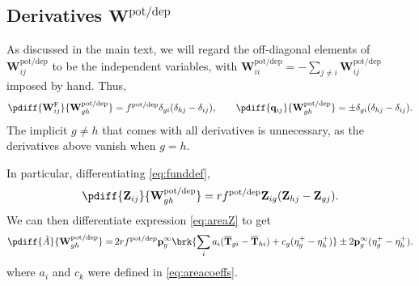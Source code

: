 \documentclass{article} %
\newcommand{\pr}{\mathbf{p}}
\newcommand{\eq}{\pr^\infty}
\newcommand{\fpt}{\mathbf{T}}
\newcommand{\fptb}{\overline{\fpt}}
\newcommand{\fund}{\mathbf{Z}}
\newcommand{\pib}{\boldsymbol{\pi}}
\newcommand{\w}{\mathbf{w}}
\newcommand{\W}{\mathbf{W}}
\newcommand{\enc}{\mathbf{q}}
\newcommand{\frg}{\W^{\mathrm{F}}}
\newcommand{\potdep}{^{\text{pot/dep}}}
\begin{document}
\subsection{Derivatives \wrt \texorpdfstring{$\W\potdep $}{W+/-}}\label{sec:deriv}

As discussed in the main text,
we will regard the off-diagonal elements of $\W\potdep _{ij}$ to be the independent variables,
with $\W\potdep _{ii}=-\sum_{j \neq i} \W\potdep _{ij}$ imposed by hand.
Thus,
%
\begin{equation}\label{eq:basicderivs}
  \pdiff{\frg_{ij}}{\W\potdep _{gh}} = f\potdep  \delta_{gi}(\delta_{hj}-\delta_{ij}),
  \qquad
  \pdiff{\enc_{ij}}{\W\potdep _{gh}} = \pm\delta_{gi}(\delta_{hj}-\delta_{ij}).
\end{equation}
%
The implicit $g \neq h$ that comes with all derivatives is unnecessary, as the derivatives above vanish when $g=h$.

In particular, differentiating \eqref{eq:funddef},
%
\begin{equation}\label{eq:derivZ}
  \pdiff{\fund_{ij}}{\W\potdep _{gh}} = rf\potdep  \fund_{ig} (\fund_{hj}-\fund_{gj}).
\end{equation}
%
We can then differentiate expression \eqref{eq:areaZ} to get
%
\begin{equation}\label{eq:derivA}
  \begin{aligned}
    \pdiff{\hat{A}}{\W\potdep _{gh}} =&\,
      2rf\potdep  \eq_g \brk{\sum_i a_i (\fptb_{gi}-\fptb_{hi}) + c_g (\eta^+_{g}-\eta^+_{h})}
      \pm 2 \eq_g (\eta^+_g - \eta^+_h). \\
  \end{aligned}
\end{equation}
%
where $a_i$ and $c_k$ were defined in \eqref{eq:areacoeffs}.
\end{document}
